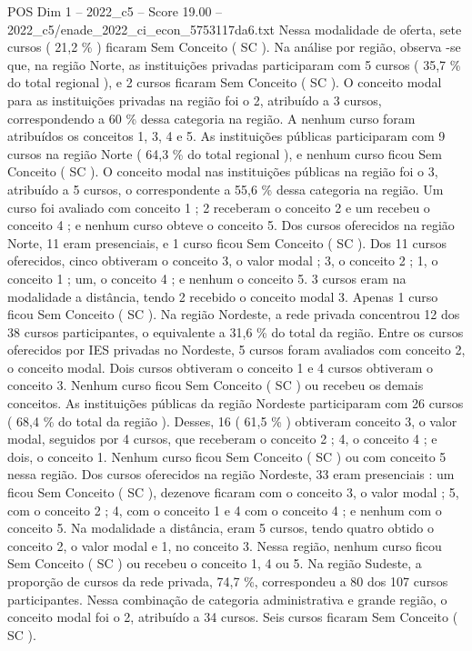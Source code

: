 \begin{textsample}{POS Dim 1 – 2022\_c5 – Score 19.00 – 2022\_c5/enade\_2022\_ci\_econ\_5753117da6.txt}
Nessa modalidade de oferta, sete cursos ( 21,2 \% ) ficaram Sem Conceito ( SC ).
Na análise por região, observa -se que, na região Norte, as instituições privadas participaram com 5 cursos ( 35,7 \% do total regional ), e 2 cursos ficaram Sem Conceito ( SC ).
O conceito modal para as instituições privadas na região foi o 2, atribuído a 3 cursos, correspondendo a 60 \% dessa categoria na região.
A nenhum curso foram atribuídos os conceitos 1, 3, 4 e 5.
As instituições públicas participaram com 9 cursos na região Norte ( 64,3 \% do total regional ), e nenhum curso ficou Sem Conceito ( SC ).
O conceito modal nas instituições públicas na região foi o 3, atribuído a 5 cursos, o correspondente a 55,6 \% dessa categoria na região.
Um curso foi avaliado com conceito 1 ; 2 receberam o conceito 2 e um recebeu o conceito 4 ; e nenhum curso obteve o conceito 5.
Dos cursos oferecidos na região Norte, 11 eram presenciais, e 1 curso ficou Sem Conceito ( SC ).
Dos 11 cursos oferecidos, cinco obtiveram o conceito 3, o valor modal ; 3, o conceito 2 ; 1, o conceito 1 ; um, o conceito 4 ; e nenhum o conceito 5. 3 cursos eram na modalidade a distância, tendo 2 recebido o conceito modal 3.
Apenas 1 curso ficou Sem Conceito ( SC ).
Na região Nordeste, a rede privada concentrou 12 dos 38 cursos participantes, o equivalente a 31,6 \% do total da região.
Entre os cursos oferecidos por IES privadas no Nordeste, 5 cursos foram avaliados com conceito 2, o conceito modal.
Dois cursos obtiveram o conceito 1 e 4 cursos obtiveram o conceito 3.
Nenhum curso ficou Sem Conceito ( SC ) ou recebeu os demais conceitos.
As instituições públicas da região Nordeste participaram com 26 cursos ( 68,4 \% do total da região ).
Desses, 16 ( 61,5 \% ) obtiveram conceito 3, o valor modal, seguidos por 4 cursos, que receberam o conceito 2 ; 4, o conceito 4 ; e dois, o conceito 1.
Nenhum curso ficou Sem Conceito ( SC ) ou com conceito 5 nessa região.
Dos cursos oferecidos na região Nordeste, 33 eram presenciais : um ficou Sem Conceito ( SC ), dezenove ficaram com o conceito 3, o valor modal ; 5, com o conceito 2 ; 4, com o conceito 1 e 4 com o conceito 4 ; e nenhum com o conceito 5.
Na modalidade a distância, eram 5 cursos, tendo quatro obtido o conceito 2, o valor modal e 1, no conceito 3.
Nessa região, nenhum curso ficou Sem Conceito ( SC ) ou recebeu o conceito 1, 4 ou 5.
Na região Sudeste, a proporção de cursos da rede privada, 74,7 \%, correspondeu a 80 dos 107 cursos participantes.
Nessa combinação de categoria administrativa e grande região, o conceito modal foi o 2, atribuído a 34 cursos.
Seis cursos ficaram Sem Conceito ( SC ).

\end{textsample}
